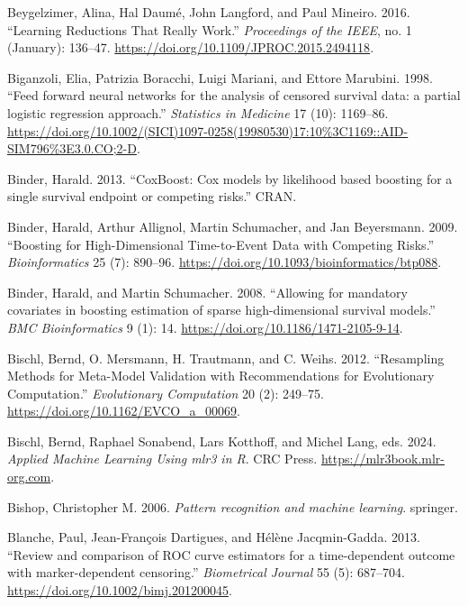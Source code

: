 \documentclass[
  letterpaper,
  krantz2]{style/krantz}
\newlength{\cslhangindent}
\newenvironment{CSLReferences}[2] %
 {\begin{list}{}{%
  \setlength{\itemindent}{0pt}
  \setlength{\leftmargin}{0pt}
  \setlength{\parsep}{0pt}
  \ifodd #1
   \setlength{\leftmargin}{\cslhangindent}
   \setlength{\itemindent}{-1\cslhangindent}
  \fi
  \setlength{\itemsep}{#2\baselineskip}}}
 {\end{list}}
\begin{document}
\begin{CSLReferences}{1}{0}
Beygelzimer, Alina, Hal Daumé, John Langford, and Paul Mineiro. 2016.
{``Learning {Reductions That Really Work}.''} \emph{Proceedings of the
IEEE}, no. 1 (January): 136--47.
\url{https://doi.org/10.1109/JPROC.2015.2494118}.

Biganzoli, Elia, Patrizia Boracchi, Luigi Mariani, and Ettore Marubini.
1998. {``{Feed forward neural networks for the analysis of censored
survival data: a partial logistic regression approach}.''}
\emph{Statistics in Medicine} 17 (10): 1169--86.
\url{https://doi.org/10.1002/(SICI)1097-0258(19980530)17:10\%3C1169::AID-SIM796\%3E3.0.CO;2-D}.

Binder, Harald. 2013. {``{CoxBoost: Cox models by likelihood based
boosting for a single survival endpoint or competing risks}.''} CRAN.

Binder, Harald, Arthur Allignol, Martin Schumacher, and Jan Beyersmann.
2009. {``Boosting for High-Dimensional Time-to-Event Data with Competing
Risks.''} \emph{Bioinformatics} 25 (7): 890--96.
\url{https://doi.org/10.1093/bioinformatics/btp088}.

Binder, Harald, and Martin Schumacher. 2008. {``{Allowing for mandatory
covariates in boosting estimation of sparse high-dimensional survival
models}.''} \emph{BMC Bioinformatics} 9 (1): 14.
\url{https://doi.org/10.1186/1471-2105-9-14}.

Bischl, Bernd, O. Mersmann, H. Trautmann, and C. Weihs. 2012.
{``{Resampling Methods for Meta-Model Validation with Recommendations
for Evolutionary Computation}.''} \emph{Evolutionary Computation} 20
(2): 249--75. \url{https://doi.org/10.1162/EVCO_a_00069}.

Bischl, Bernd, Raphael Sonabend, Lars Kotthoff, and Michel Lang, eds.
2024. \emph{{Applied Machine Learning Using mlr3 in R}}. CRC Press.
\url{https://mlr3book.mlr-org.com}.

Bishop, Christopher M. 2006. \emph{{Pattern recognition and machine
learning}}. springer.

Blanche, Paul, Jean-François Dartigues, and Hélène Jacqmin-Gadda. 2013.
{``{Review and comparison of ROC curve estimators for a time-dependent
outcome with marker-dependent censoring}.''} \emph{Biometrical Journal}
55 (5): 687--704. \url{https://doi.org/10.1002/bimj.201200045}.


\end{CSLReferences}
\end{document}
